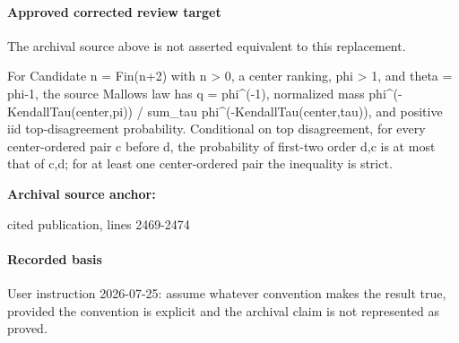 \documentclass[10pt]{article}
\begin{document}
\paragraph{Approved corrected review target}
The archival source above is not asserted equivalent to this replacement.
\begin{ReviewVerbatim}
For Candidate n = Fin(n+2) with n > 0, a center ranking, phi > 1, and theta = phi-1, the source Mallows law has q = phi^(-1), normalized mass phi^(-KendallTau(center,pi)) / sum_tau phi^(-KendallTau(center,tau)), and positive iid top-disagreement probability. Conditional on top disagreement, for every center-ordered pair c before d, the probability of first-two order d,c is at most that of c,d; for at least one center-ordered pair the inequality is strict.
\end{ReviewVerbatim}

\textbf{Archival source anchor:} {\footnotesize\raggedright cited publication, lines 2469-\allowbreak{}2474\par}
\paragraph{Recorded basis}
User instruction 2026-\allowbreak{}07-\allowbreak{}25:\allowbreak{} assume whatever convention makes the result true, provided the convention is explicit and the archival claim is not represented as proved.\allowbreak{}
\end{document}
